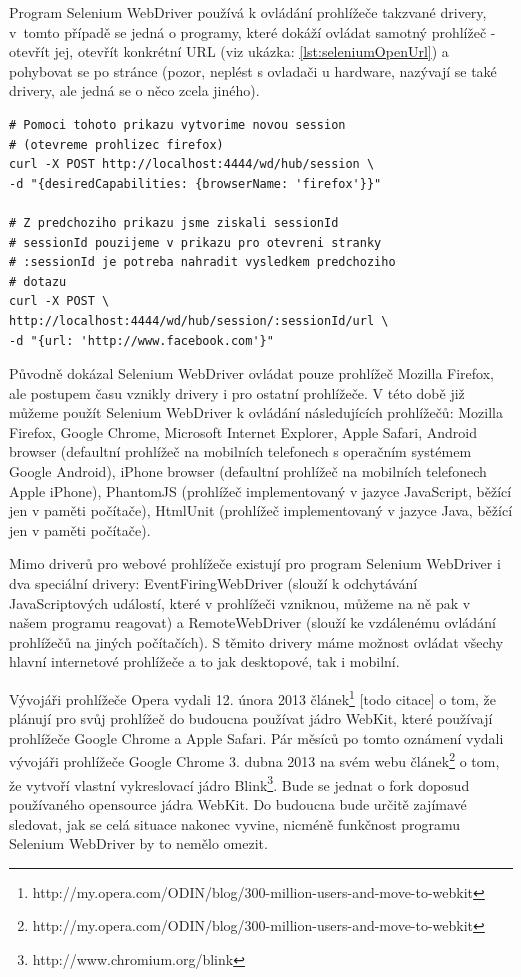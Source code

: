 \documentclass[thesis=M,czech]{FITthesis}[2013/05/10]
\begin{document}
Program Selenium WebDriver používá k ovládání prohlížeče takzvané drivery, v~tomto případě se jedná o programy, které dokáží ovládat samotný prohlížeč - otevřít jej, otevřít konkrétní URL (viz ukázka: \ref{lst:seleniumOpenUrl}) a pohybovat se po stránce (pozor, neplést s ovladači u hardware, nazývají se také drivery, ale jedná se o něco zcela jiného). 

\begin{lstlisting}[caption={Příklad otevření URL v programu Selenium WebDriver pomocí cURL},label=lst:seleniumOpenUrl,belowcaptionskip=0.4cm]
# Pomoci tohoto prikazu vytvorime novou session 
# (otevreme prohlizec firefox)
curl -X POST http://localhost:4444/wd/hub/session \
-d "{desiredCapabilities: {browserName: 'firefox'}}"

# Z predchoziho prikazu jsme ziskali sessionId
# sessionId pouzijeme v prikazu pro otevreni stranky
# :sessionId je potreba nahradit vysledkem predchoziho
# dotazu
curl -X POST \
http://localhost:4444/wd/hub/session/:sessionId/url \
-d "{url: 'http://www.facebook.com'}" 
\end{lstlisting}

Původně dokázal Selenium WebDriver ovládat pouze prohlížeč Mozilla Firefox, ale postupem času vznikly drivery i pro ostatní prohlížeče. V této době již můžeme použít Selenium WebDriver k ovládání následujících prohlížečů: Mozilla Firefox, Google Chrome, Microsoft Internet Explorer, Apple Safari, Android browser (defaultní prohlížeč na mobilních telefonech s operačním systémem Google Android), iPhone browser (defaultní prohlížeč na mobilních telefonech Apple iPhone), PhantomJS (prohlížeč implementovaný v jazyce JavaScript, běžící jen v paměti počítače), HtmlUnit (prohlížeč implementovaný v jazyce Java, běžící jen v paměti počítače). 

Mimo driverů pro webové prohlížeče existují pro program Selenium WebDriver i dva speciální drivery: EventFiringWebDriver (slouží k odchytávání JavaScriptových událostí, které v prohlížeči vzniknou, můžeme na ně pak v našem programu reagovat) a RemoteWebDriver (slouží ke vzdálenému ovládání prohlížečů na jiných počítačích). S těmito drivery máme možnost ovládat všechy hlavní internetové prohlížeče a to jak desktopové, tak i mobilní.

Vývojáři prohlížeče Opera vydali 12. února 2013 
článek\footnote{http://my.opera.com/ODIN/blog/300-million-users-and-move-to-webkit} [todo citace] o tom, že plánují pro svůj prohlížeč do budoucna používat jádro WebKit, které používají prohlížeče Google Chrome a Apple Safari. Pár měsíců po tomto oznámení vydali vývojáři prohlížeče Google Chrome 3. dubna 2013 na svém webu článek\footnote{http://my.opera.com/ODIN/blog/300-million-users-and-move-to-webkit} o tom, že vytvoří vlastní vykreslovací jádro Blink\footnote{http://www.chromium.org/blink}. Bude se jednat o fork doposud používaného opensource jádra WebKit. Do budoucna bude určitě zajímavé sledovat, jak se celá situace nakonec vyvine, nicméně funkčnost programu Selenium WebDriver by to nemělo omezit.
\end{document}
